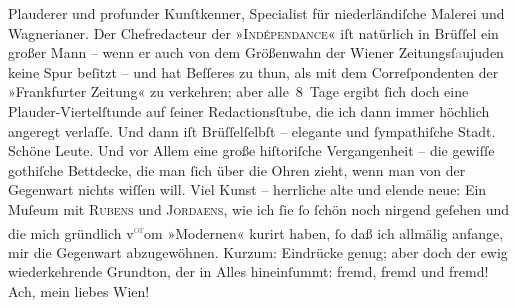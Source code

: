                   Plauderer und profunder
                  Kunſtkenner, Specialist für niederländiſche Malerei und \label{K_L02664-8v}\label{K_L02664-8}Wagnerianer. Der Chefredacteur der »\textsc{Indépendance}« iſt natürlich in Brüſſel ein großer Mann – wenn \introOben{}er\introOben{} auch von dem Größenwahn der Wiener Zeitungsſ\textcolor{gray}{a}ujuden keine Spur beſitzt – und hat
               Beſſeres zu thun, als mit dem Correſpondenten der »Frankfurter Zeitung« zu verkehren; aber alle 8 Tage ergibt{ }ſich doch eine
               Plauder-Viertelſtunde auf{ }ſeiner Redactionsſtube, die ich dann immer höchlich angeregt verlaſſe. Und dann iſt
                  Brüſſelſelbſt – elegante und{ }ſympathiſche Stadt. Schöne Leute. Und vor
               Allem eine große hiſtoriſche Vergangenheit – die gewiſſe gothiſche Bettdecke, die man{ }ſich über die  Ohren zieht, wenn man von der
               Gegenwart nichts wiſſen will. {\pb}Viel Kunst –
               herrliche alte und elende neue: Ein Muſeum mit \textsc{Rubens} und \textsc{Jordaens}, wie ich{ }ſie{ }ſo{ }ſchön noch nirgend geſehen und die mich gründlich v\substVorne{}\textsuperscript{\textcolor{gray}{or}}\substDazwischen{}om\substHinten{} »Modernen« kurirt haben,{ }ſo daß ich allmälig anfange, mir die Gegenwart
               abzugewöhnen. Kurzum: Eindrücke genug; aber doch der ewig wiederkehrende Grundton,
               der in Alles hineinſummt: fremd, fremd und fremd! Ach, mein liebes Wien! {\dotsfive}\pend
           
